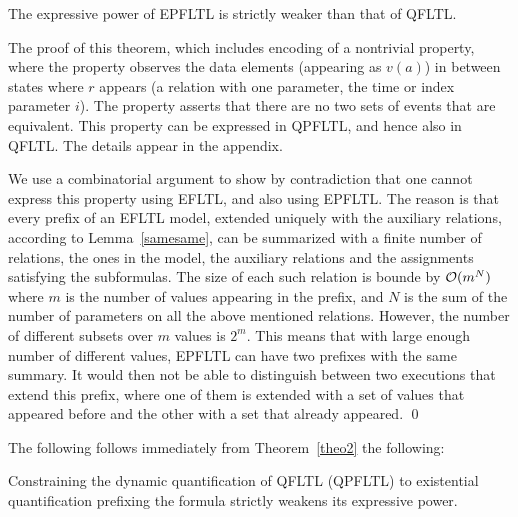 \begin{theorem}
\label{theo2}
The expressive power of EPFLTL is strictly weaker than that of QFLTL.
\end{theorem}

The proof of this theorem, which includes encoding of a nontrivial property, where the property
observes the data elements (appearing as $v (a)$)
in between states where $r$ appears (a relation with
one parameter, the time or index parameter $i$).
The property asserts that there are no two sets of events that are equivalent.
This property can be expressed in QPFLTL, and hence
also in QFLTL. The details appear in the appendix.

We use a combinatorial argument to show by contradiction that one cannot express this property
using EFLTL, and also using EPFLTL. The reason is that every prefix of an EFLTL model, extended uniquely with the
auxiliary relations, according to Lemma~\ref{samesame}, can be summarized with a finite number of relations, the ones in
the model, the auxiliary relations and the
assignments satisfying the subformulas. The size of
each such relation is bounde by ${\cal O} (  m ^ N )$
where $m$ is the number of values appearing in the
prefix, and $N$ is the sum of the number of parameters on all the above mentioned relations.
However, the number of different subsets over $m$ values is
$2^m$. This means that with large enough number of different values, EPFLTL can have two prefixes with the same summary. It would then not be able to distinguish between two executions that extend
this prefix, where one of them is extended with a set of values that appeared before and the other with 
a set that already appeared. \qed


The following follows immediately from Theorem~\ref{theo2} the following:

\begin{corollary}
Constraining the dynamic quantification of QFLTL (QPFLTL) to existential quantification prefixing the
formula strictly weakens its expressive power.
\end{corollary}


